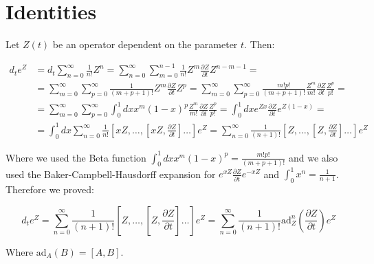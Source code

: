 \chapter{Identities}
\label{AP3B}
Let $Z(t)$ be an operator dependent on the parameter $t$. Then:

\begin{align*}
d_t e^{Z} &= d_t \sum_{n=0}^\infty \frac{1}{n!} Z^n = \sum_{n=0}^\infty \sum_{m=0}^{n-1} \frac{1}{n!} Z^m \frac{\partial Z}{\partial t} Z^{n-m-1} = \\
&= \sum_{m=0}^\infty \sum_{p=0}^\infty \frac{1}{(m+p+1)!}Z^m \frac{\partial Z}{\partial t} Z^p = \sum_{m=0}^\infty \sum_{p=0}^\infty \frac{m!p!}{(m+p+1)!} \frac{Z^m}{m!} \frac{\partial Z}{\partial t} \frac{Z^p}{p!} =\\
&= \sum_{m=0}^\infty \sum_{p=0}^\infty \int_0^1 dx x^m (1-x)^p \frac{Z^m}{m!} \frac{\partial Z}{\partial t} \frac{Z^p}{p!} = \int_0^1 dx e^{Zx} \frac{\partial Z}{\partial t} e^{Z(1-x)} = \\
&= \int_0^1 dx \sum_{n=0}^\infty \frac{1}{n!} \left[xZ, \dots, \left[xZ, \frac{\partial Z}{\partial t}\right] \dots \right] e^Z = \sum_{n=0}^\infty \frac{1}{(n+1)!} \left[Z, \dots, \left[Z, \frac{\partial Z}{\partial t}\right] \dots \right] e^Z
\end{align*}

Where we used the Beta function $\int_0^1 dx x^m (1-x)^p = \frac{m!p!}{(m+p+1)!}$ and we also used the Baker-Campbell-Hausdorff expansion for $e^{xZ}\frac{\partial Z}{\partial t}e^{-xZ}$ and $\int_0^1 x^n = \frac{1}{n+1}$. Therefore we proved:

\begin{equation}
\label{SneidersID}
d_t e^{Z} = \sum_{n=0}^\infty \frac{1}{(n+1)!} \left[Z, \dots, \left[Z, \frac{\partial Z}{\partial t}\right] \dots \right] e^Z = \sum_{n=0}^\infty \frac{1}{(n+1)!} \text{ad}_Z ^n \left(\frac{\partial Z}{\partial t}\right) e^Z
\end{equation}

Where $\text{ad}_A(B) = [A,B]$.